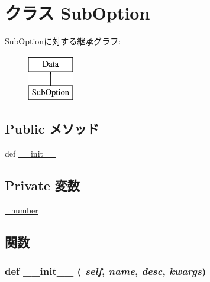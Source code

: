 \hypertarget{classm5_1_1util_1_1jobfile_1_1SubOption}{
\section{クラス SubOption}
\label{classm5_1_1util_1_1jobfile_1_1SubOption}
}
SubOptionに対する継承グラフ:\begin{figure}[H]
\begin{center}
\leavevmode
\includegraphics[height=2cm]{classm5_1_1util_1_1jobfile_1_1SubOption}
\end{center}
\end{figure}
\subsection*{Public メソッド}
\begin{DoxyCompactItemize}
\item 
def \hyperlink{classm5_1_1util_1_1jobfile_1_1SubOption_ac775ee34451fdfa742b318538164070e}{\_\-\_\-init\_\-\_\-}
\end{DoxyCompactItemize}
\subsection*{Private 変数}
\begin{DoxyCompactItemize}
\item 
\hyperlink{classm5_1_1util_1_1jobfile_1_1SubOption_a323644ffc835b0fba1e3e75e7ee48903}{\_\-number}
\end{DoxyCompactItemize}


\subsection{関数}
\hypertarget{classm5_1_1util_1_1jobfile_1_1SubOption_ac775ee34451fdfa742b318538164070e}{
\subsubsection[{\_\-\_\-init\_\-\_\-}]{\setlength{\rightskip}{0pt plus 5cm}def \_\-\_\-init\_\-\_\- ( {\em self}, \/   {\em name}, \/   {\em desc}, \/   {\em kwargs})}}
\label{classm5_1_1util_1_1jobfile_1_1SubOption_ac775ee34451fdfa742b318538164070e}


